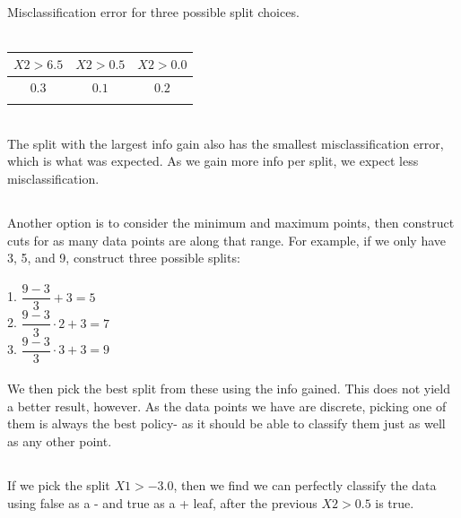 \documentclass[12pt, oneside]{article}   	%
\begin{document}
\subsection{}

Misclassification error for three possible split choices. \\ \\

\begin{tabular}{ c | c | c}
	$X2 > 6.5$ & $X2 > 0.5$ & $X2 > 0.0$ \\
	\hline
	$0.3$ & $0.1$ & $0.2$ \\ \\
\end{tabular} \\
The split with the largest info gain also has the smallest misclassification error, which is what was expected. As we gain more info per split, we expect less misclassification. 

\subsection{}

Another option is to consider the minimum and maximum points, then construct cuts for as many data points are along that range. For example, if we only have 3, 5, and 9, construct three possible splits: \\ \\
1. $\dfrac{9-3}{3} + 3 = 5$ \\
2. $\dfrac{9-3}{3} \cdot 2 + 3 = 7$ \\
3. $\dfrac{9-3}{3} \cdot 3 + 3 = 9$ \\ \\

We then pick the best split from these using the info gained. This does not yield a better result, however. As the data points we have are discrete, picking one of them is always the best policy- as it should be able to classify them just as well as any other point. 

\subsection{}

If we pick the split $X1>-3.0$, then we find we can perfectly classify the data using false as a - and true as a + leaf, after the previous $X2>0.5$ is true. 
\end{document}
